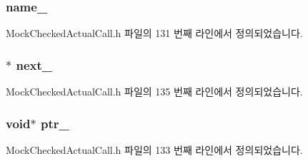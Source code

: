 \subsubsection[{\texorpdfstring{name\+\_\+}{name_}}]{ name\+\_\+}\hypertarget{class_mock_checked_actual_call_1_1_mock_output_parameters_list_node_aac73c86e1e892f392d1fc423e25f51a8}{}\label{class_mock_checked_actual_call_1_1_mock_output_parameters_list_node_aac73c86e1e892f392d1fc423e25f51a8}


Mock\+Checked\+Actual\+Call.\+h 파일의 131 번째 라인에서 정의되었습니다.

\subsubsection[{\texorpdfstring{next\+\_\+}{next_}}]{$\ast$ next\+\_\+}\hypertarget{class_mock_checked_actual_call_1_1_mock_output_parameters_list_node_a48980b6753fe91ed89c1959b171615d6}{}\label{class_mock_checked_actual_call_1_1_mock_output_parameters_list_node_a48980b6753fe91ed89c1959b171615d6}


Mock\+Checked\+Actual\+Call.\+h 파일의 135 번째 라인에서 정의되었습니다.

\subsubsection[{\texorpdfstring{ptr\+\_\+}{ptr_}}]{\setlength{\rightskip}{0pt plus 5cm}void$\ast$ ptr\+\_\+}\hypertarget{class_mock_checked_actual_call_1_1_mock_output_parameters_list_node_afbe2be78a3ee81b2e3c6821cec74e116}{}\label{class_mock_checked_actual_call_1_1_mock_output_parameters_list_node_afbe2be78a3ee81b2e3c6821cec74e116}


Mock\+Checked\+Actual\+Call.\+h 파일의 133 번째 라인에서 정의되었습니다.

